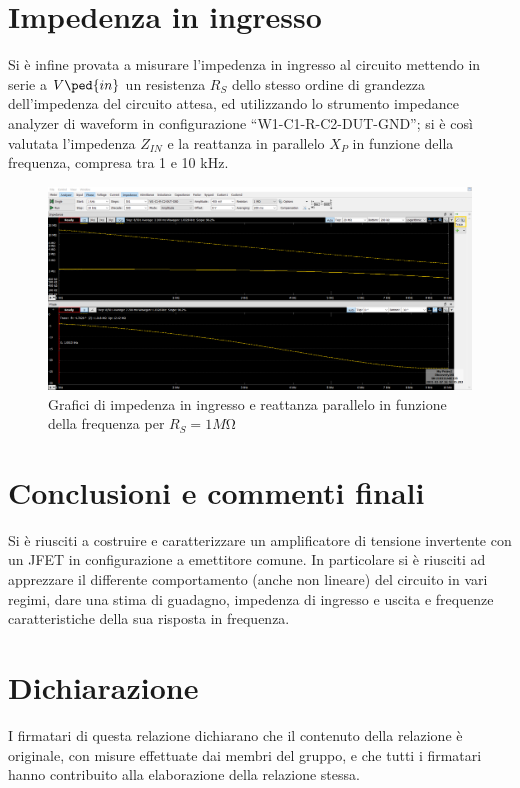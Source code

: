 \documentclass[10pt, a4paper, italian]{article}
\begin{document}
\section{Impedenza in ingresso}
Si è infine provata a misurare l'impedenza in ingresso al circuito mettendo in serie a $V\ped{in}$ un resistenza $R_S$ dello stesso ordine di grandezza dell'impedenza del circuito attesa, ed utilizzando lo strumento impedance analyzer di waveform in configurazione “W1-C1-R-C2-DUT-GND”; si è così valutata l'impedenza $Z_{IN}$ e la reattanza in parallelo $X_P$ in funzione della frequenza, compresa tra 1 e 10 kHz.
\begin{figure}[htbp]
    \centering
	\includegraphics[scale=0.4]{amp}
    \caption{Grafici di impedenza in ingresso e reattanza parallelo in funzione della frequenza per $R_S=1 \si{M\ohm}$}
\end{figure}

\section*{Conclusioni e commenti finali}
Si è riusciti a costruire e caratterizzare un amplificatore di tensione
invertente con un JFET in configurazione a emettitore comune. In particolare
si è riusciti ad apprezzare il differente comportamento (anche non lineare)
del circuito in vari regimi, dare una stima di guadagno, impedenza di
ingresso e uscita e frequenze caratteristiche della sua risposta in frequenza.

\section*{Dichiarazione}
I firmatari di questa relazione dichiarano che il contenuto della relazione \`e
originale, con misure effettuate dai membri del gruppo, e che tutti i firmatari
hanno contribuito alla elaborazione della relazione stessa.
\end{document}
